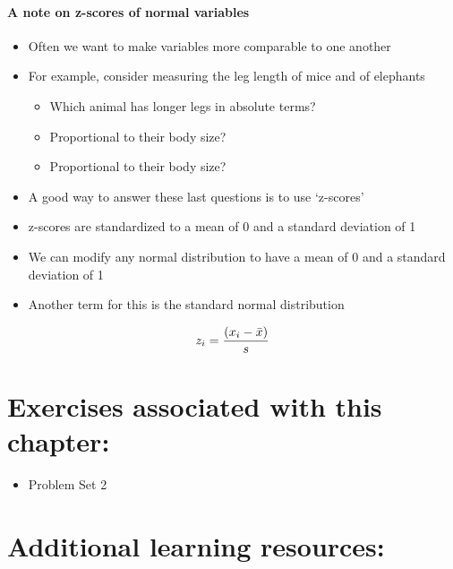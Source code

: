 \documentclass[]{book}
\providecommand{\tightlist}{%
  \setlength{\itemsep}{0pt}\setlength{\parskip}{0pt}}
\let\oldparagraph\paragraph
\renewcommand{\paragraph}[1]{\oldparagraph{#1}\mbox{}}
\begin{document}
\hypertarget{a-note-on-z-scores-of-normal-variables}{%
\paragraph{A note on z-scores of normal variables}\label{a-note-on-z-scores-of-normal-variables}}

\begin{itemize}
\tightlist
\item
  Often we want to make variables more comparable to one another
\item
  For example, consider measuring the leg length of mice and of elephants

  \begin{itemize}
  \tightlist
  \item
    Which animal has longer legs in absolute terms?
  \item
    Proportional to their body size?
  \item
    Proportional to their body size?
  \end{itemize}
\item
  A good way to answer these last questions is to use `z-scores'
\end{itemize}

\begin{itemize}
\tightlist
\item
  z-scores are standardized to a mean of 0 and a standard deviation of 1
\item
  We can modify any normal distribution to have a mean of 0 and a standard deviation of 1
\item
  Another term for this is the standard normal distribution
\end{itemize}

\[\huge z_i = \frac{(x_i - \bar{x})}{s}\]

\hypertarget{exercises-associated-with-this-chapter-3}{%
\section{Exercises associated with this chapter:}\label{exercises-associated-with-this-chapter-3}}

\begin{itemize}
\tightlist
\item
  Problem Set 2
\end{itemize}

\hypertarget{additional-learning-resources-3}{%
\section{Additional learning resources:}\label{additional-learning-resources-3}}
\end{document}
